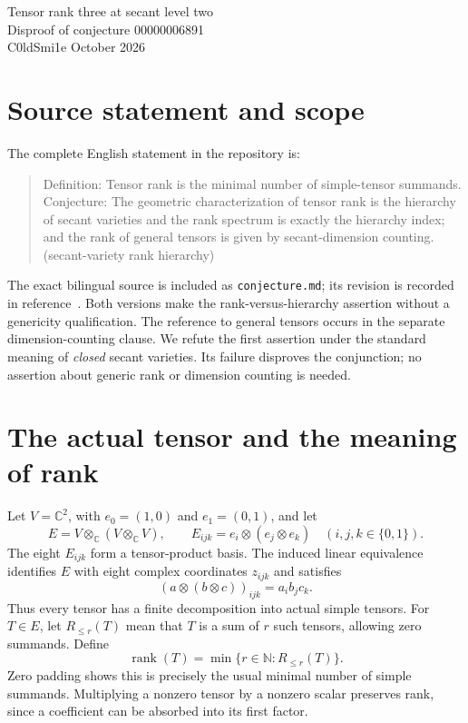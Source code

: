 \documentclass[11pt,a4paper]{article}
\newcommand{\C}{\mathbb C}
\newcommand{\N}{\mathbb N}
\newcommand{\rk}{\operatorname{rank}}
\newcommand{\code}[1]{\nolinkurl{#1}}
\begin{document}
\begin{center}
{\LARGE Tensor rank three at secant level two}\\[8pt]
{\large Disproof of conjecture 00000006891}\\[5pt]
C0ldSmi1e  October 2026
\end{center}
\begin{abstract}
An explicit tensor in $\C^2\otimes_{\C}(\C^2\otimes_{\C}\C^2)$ has ordinary tensor rank three, while its projective class first appears in the second closed secant variety of the Segre locus. We prove both exact values. The Lean formalization uses actual tensor products, actual projective points and projective spans, and the homogeneous-equation characterization of projective Zariski closure. This contradicts the conjectured equality of tensor rank and secant hierarchy index.
\end{abstract}

\section{Source statement and scope}
The complete English statement in the repository is:
\begin{quote}\small
Definition: Tensor rank is the minimal number of simple-tensor summands. Conjecture: The geometric characterization of tensor rank is the hierarchy of secant varieties and the rank spectrum is exactly the hierarchy index; and the rank of general tensors is given by secant-dimension counting. (secant-variety rank hierarchy)
\end{quote}
The exact bilingual source is included as \code{conjecture.md}; its revision is recorded in reference~\cite{source}. Both versions make the rank-versus-hierarchy assertion without a genericity qualification. The reference to general tensors occurs in the separate dimension-counting clause. We refute the first assertion under the standard meaning of \emph{closed} secant varieties. Its failure disproves the conjunction; no assertion about generic rank or dimension counting is needed.

\section{The actual tensor and the meaning of rank}
Let $V=\C^2$, with $e_0=(1,0)$ and $e_1=(0,1)$, and let
\[
E=V\otimes_{\C}(V\otimes_{\C}V),\qquad
E_{ijk}=e_i\otimes(e_j\otimes e_k)\quad(i,j,k\in\{0,1\}).
\]
The eight $E_{ijk}$ form a tensor-product basis. The induced linear equivalence identifies $E$ with eight complex coordinates $z_{ijk}$ and satisfies
\[
(a\otimes(b\otimes c))_{ijk}=a_i b_j c_k.
\]
Thus every tensor has a finite decomposition into actual simple tensors. For $T\in E$, let $R_{\le r}(T)$ mean that $T$ is a sum of $r$ such tensors, allowing zero summands. Define
\[
\rk(T)=\min\{r\in\N:R_{\le r}(T)\}.
\]
Zero padding shows this is precisely the usual minimal number of simple summands. Multiplying a nonzero tensor by a nonzero scalar preserves rank, since a coefficient can be absorbed into its first factor.
\end{document}
